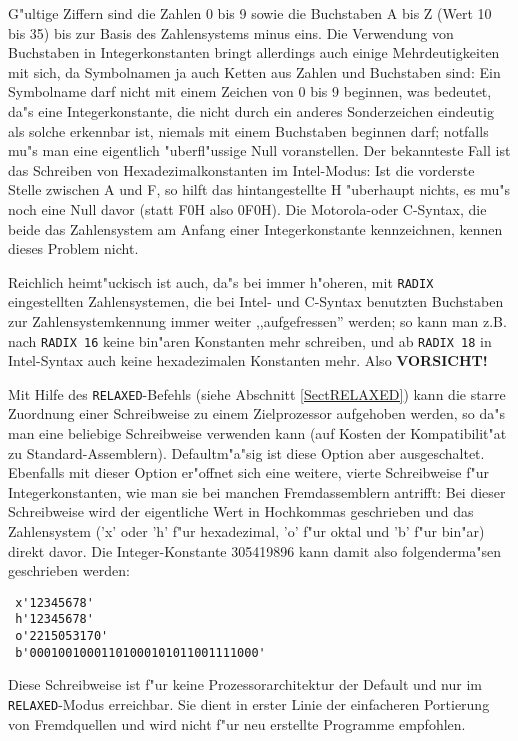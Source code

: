 \documentclass[12pt,a4paper,twoside]{report}
\newcommand{\tty}[1]{{\tt #1}}
\begin{document}
G"ultige Ziffern sind die Zahlen 0 bis 9 sowie die Buchstaben A bis Z
(Wert 10 bis 35) bis zur Basis des Zahlensystems minus eins.  Die
Verwendung von Buchstaben in Integerkonstanten bringt allerdings auch
einige Mehrdeutigkeiten mit sich, da Symbolnamen ja auch Ketten aus Zahlen
und Buchstaben sind: Ein Symbolname darf nicht mit einem Zeichen von 0 bis
9 beginnen, was bedeutet, da"s eine Integerkonstante, die nicht durch ein
anderes Sonderzeichen eindeutig als solche erkennbar ist, niemals mit
einem Buchstaben beginnen darf; notfalls mu"s man eine eigentlich
"uberfl"ussige Null voranstellen.  Der bekannteste Fall ist das Schreiben
von Hexadezimalkonstanten im Intel-Modus: Ist die vorderste Stelle
zwischen A und F, so hilft das hintangestellte H "uberhaupt nichts, es
mu"s noch eine Null davor (statt F0H also 0F0H).  Die Motorola-oder
C-Syntax, die beide das Zahlensystem am Anfang einer Integerkonstante
kennzeichnen, kennen dieses Problem nicht.

Reichlich heimt"uckisch ist auch, da"s bei immer h"oheren, mit {\tt RADIX}
eingestellten Zahlensystemen, die bei Intel- und C-Syntax benutzten
Buchstaben zur Zahlensystemkennung immer weiter ,,aufgefressen'' werden; so
kann man z.B. nach {\tt RADIX 16} keine bin"aren Konstanten mehr
schreiben, und ab {\tt RADIX 18} in Intel-Syntax auch keine hexadezimalen
Konstanten mehr.  Also {\bf VORSICHT!}

Mit Hilfe des \tty{RELAXED}-Befehls (siehe Abschnitt \ref{SectRELAXED})
kann die starre Zuordnung einer Schreibweise zu einem Zielprozessor
aufgehoben werden, so da"s man eine beliebige Schreibweise verwenden
kann (auf Kosten der Kompatibilit"at zu Standard-Assemblern).
Defaultm"a"sig ist diese Option aber ausgeschaltet.  Ebenfalls mit dieser
Option er"offnet sich eine weitere, vierte Schreibweise f"ur
Integerkonstanten, wie man sie bei manchen Fremdassemblern antrifft:  Bei
dieser Schreibweise wird der eigentliche Wert in Hochkommas geschrieben
und das Zahlensystem ('x' oder 'h' f"ur hexadezimal, 'o' f"ur oktal und 'b'
f"ur bin"ar) direkt davor.  Die Integer-Konstante 305419896 kann damit
also folgenderma"sen geschrieben werden:
\begin{verbatim}
 x'12345678'
 h'12345678'
 o'2215053170'
 b'00010010001101000101011001111000'
\end{verbatim}
Diese Schreibweise ist f"ur keine Prozessorarchitektur der Default und nur
im \tty{RELAXED}-Modus erreichbar.  Sie dient in erster Linie der
einfacheren Portierung von Fremdquellen und wird nicht f"ur neu erstellte
Programme empfohlen.
\end{document}
